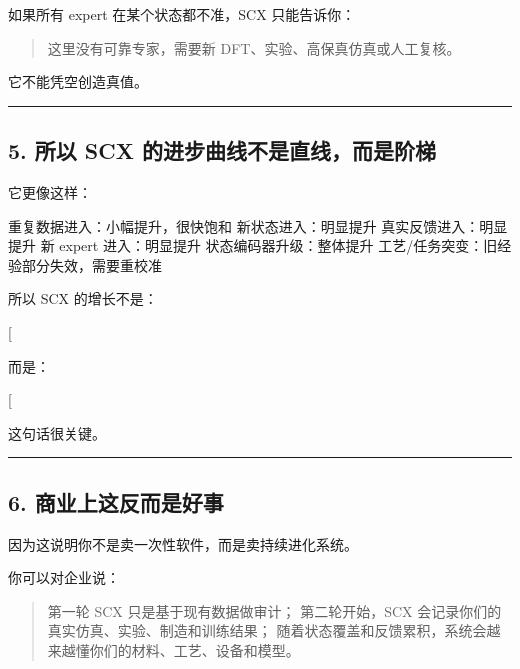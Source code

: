 \documentclass[
  12pt,
]{ctexart}
\newenvironment{Shaded}{}{}
\newcommand{\NormalTok}[1]{#1}
\begin{document}
如果所有 expert 在某个状态都不准，SCX 只能告诉你：

\begin{quote}
这里没有可靠专家，需要新 DFT、实验、高保真仿真或人工复核。
\end{quote}

它不能凭空创造真值。

\begin{center}\rule{0.5\linewidth}{0.5pt}\end{center}

\subsection{5. 所以 SCX
的进步曲线不是直线，而是阶梯}\label{ux6240ux4ee5-scx-ux7684ux8fdbux6b65ux66f2ux7ebfux4e0dux662fux76f4ux7ebfux800cux662fux9636ux68af}

它更像这样：

\begin{Shaded}
\begin{Highlighting}[]
\NormalTok{重复数据进入：小幅提升，很快饱和}
\NormalTok{新状态进入：明显提升}
\NormalTok{真实反馈进入：明显提升}
\NormalTok{新 expert 进入：明显提升}
\NormalTok{状态编码器升级：整体提升}
\NormalTok{工艺/任务突变：旧经验部分失效，需要重校准}
\end{Highlighting}
\end{Shaded}

所以 SCX 的增长不是：

{[}  \Rightarrow \text{always better}{]}

而是：

{[}  \Rightarrow \text{better SCX}{]}

这句话很关键。

\begin{center}\rule{0.5\linewidth}{0.5pt}\end{center}

\subsection{6.
商业上这反而是好事}\label{ux5546ux4e1aux4e0aux8fd9ux53cdux800cux662fux597dux4e8b}

因为这说明你不是卖一次性软件，而是卖持续进化系统。

你可以对企业说：

\begin{quote}
第一轮 SCX 只是基于现有数据做审计； 第二轮开始，SCX
会记录你们的真实仿真、实验、制造和训练结果；
随着状态覆盖和反馈累积，系统会越来越懂你们的材料、工艺、设备和模型。
\end{quote}
\end{document}

